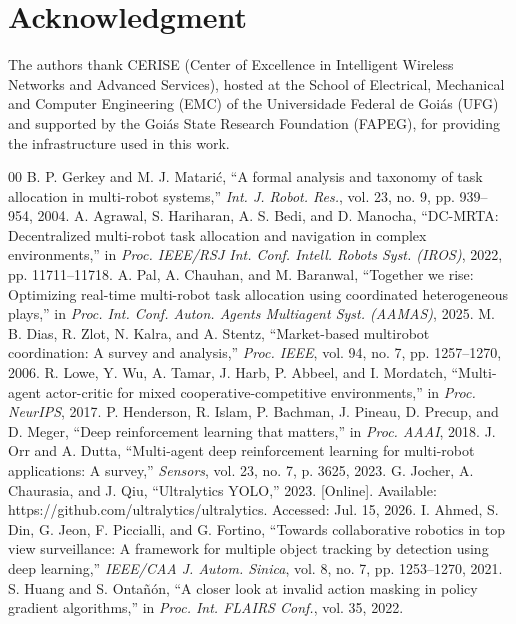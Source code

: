 \documentclass[conference]{IEEEtran}
\begin{document}
\balance
\section*{Acknowledgment}
The authors thank CERISE (Center of Excellence in Intelligent Wireless Networks and Advanced Services), hosted at the School of Electrical, Mechanical and Computer Engineering (EMC) of the Universidade Federal de Goiás (UFG) and supported by the Goiás State Research Foundation (FAPEG), for providing the infrastructure used in this work.

\begin{thebibliography}{00}
 B. P. Gerkey and M. J. Matarić, ``A formal analysis and taxonomy of task allocation in multi-robot systems,'' \textit{Int. J. Robot. Res.}, vol. 23, no. 9, pp. 939--954, 2004.
 A. Agrawal, S. Hariharan, A. S. Bedi, and D. Manocha, ``DC-MRTA: Decentralized multi-robot task allocation and navigation in complex environments,'' in \textit{Proc. IEEE/RSJ Int. Conf. Intell. Robots Syst. (IROS)}, 2022, pp. 11711--11718.
 A. Pal, A. Chauhan, and M. Baranwal, ``Together we rise: Optimizing real-time multi-robot task allocation using coordinated heterogeneous plays,'' in \textit{Proc. Int. Conf. Auton. Agents Multiagent Syst. (AAMAS)}, 2025.
 M. B. Dias, R. Zlot, N. Kalra, and A. Stentz, ``Market-based multirobot coordination: A survey and analysis,'' \textit{Proc. IEEE}, vol. 94, no. 7, pp. 1257--1270, 2006.
 R. Lowe, Y. Wu, A. Tamar, J. Harb, P. Abbeel, and I. Mordatch, ``Multi-agent actor-critic for mixed cooperative-competitive environments,'' in \textit{Proc. NeurIPS}, 2017.
 P. Henderson, R. Islam, P. Bachman, J. Pineau, D. Precup, and D. Meger, ``Deep reinforcement learning that matters,'' in \textit{Proc. AAAI}, 2018.
 J. Orr and A. Dutta, ``Multi-agent deep reinforcement learning for multi-robot applications: A survey,'' \textit{Sensors}, vol. 23, no. 7, p. 3625, 2023.
 G. Jocher, A. Chaurasia, and J. Qiu, ``Ultralytics YOLO,'' 2023. [Online]. Available: https://github.com/ultralytics/ultralytics. Accessed: Jul. 15, 2026.
 I. Ahmed, S. Din, G. Jeon, F. Piccialli, and G. Fortino, ``Towards collaborative robotics in top view surveillance: A framework for multiple object tracking by detection using deep learning,'' \textit{IEEE/CAA J. Autom. Sinica}, vol. 8, no. 7, pp. 1253--1270, 2021.
 S. Huang and S. Ontañón, ``A closer look at invalid action masking in policy gradient algorithms,'' in \textit{Proc. Int. FLAIRS Conf.}, vol. 35, 2022.

\end{thebibliography}
\end{document}
